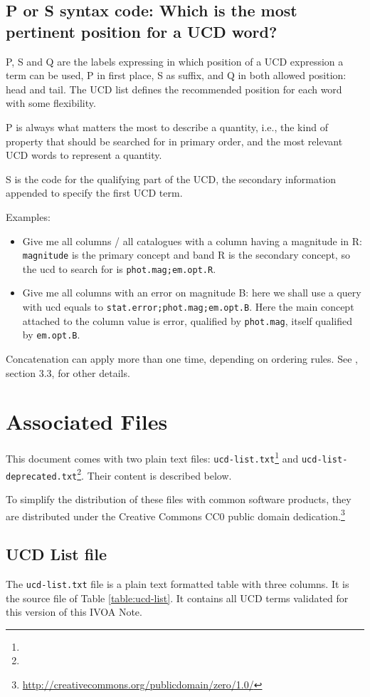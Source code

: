 \documentclass[11pt,a4paper]{ivoa}
\begin{document}
\subsection{P or S syntax code: Which is the most pertinent position for a UCD word?}
P, S and Q are the labels expressing in which position of a UCD expression a term can be used, P 
in first place, S as suffix, and Q in both allowed position: head and tail. The UCD list defines 
the recommended position for each word with some flexibility.

P is always what matters the most to describe a quantity, i.e., the kind of property that should be 
searched for in primary order, and the most relevant UCD words to represent a quantity.

S is the code for the qualifying part of the UCD, the secondary information appended to specify 
the first UCD term.

Examples:
\begin{itemize}
\item Give me all columns / all catalogues with a column having a magnitude in R: {\tt magnitude} 
is the primary concept and band R is the secondary concept, so the ucd to search for is 
{\tt phot.mag;em.opt.R}.
\item Give me all columns with an error on magnitude B: here we shall use a query with ucd 
equals to {\tt stat.error;phot.mag;em.opt.B}. Here the main concept attached to the column 
value is error, qualified by {\tt phot.mag}, itself qualified by {\tt em.opt.B}.
\end{itemize}
Concatenation can apply more than one time, depending on ordering rules. See \citet{2005ivoa.spec.0819D}, section 3.3, 
for other details.

\section{Associated Files}
This document comes with two plain text files:
\texttt{ucd-list.txt}\footnote{} and 
\texttt{ucd-list-deprecated.txt}\footnote{}. 
Their content is described below. 

To simplify the distribution of these files with common software
products, they are distributed under the Creative Commons CC0 public
domain dedication.\footnote{\url{http://creativecommons.org/publicdomain/zero/1.0/}}

\subsection{UCD List file}
The \texttt{ucd-list.txt} file is a plain text formatted table with three columns.
It is the source file of Table \ref{table:ucd-list}. It contains all UCD terms validated 
for this version of this IVOA Note.
\end{document}
